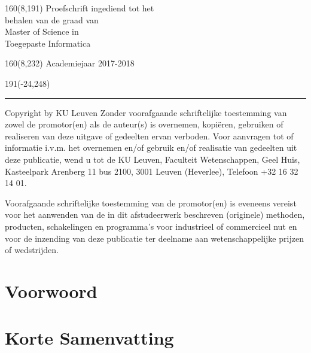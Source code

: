 \documentclass[12pt,a4paper,oneside]{book}
\begin{document}
%
\begin{textblock}{160}(8,191)
\textblockcolour{}
\vspace{-\parskip}
\flushright
Proefschrift ingediend tot het\\[4.5pt]
behalen van de graad van\\[4.5pt]
Master of Science in\\[4.5pt]
Toegepaste Informatica\\
\end{textblock}
%
\begin{textblock}{160}(8,232)
\textblockcolour{}
\vspace{-\parskip}
\flushright
Academiejaar 2017-2018
\end{textblock}
%
\begin{textblock}{191}(-24,248)
{\color{blueline}\rule{550pt}{5.5pt}}
\end{textblock}
%
\vfill
\newpage

\textsf{\textcopyright} Copyright by KU Leuven
Zonder voorafgaande schriftelijke toestemming van zowel de promotor(en) als de auteur(s) is overnemen, kopiëren, gebruiken of realiseren van deze uitgave of gedeelten ervan verboden. Voor aanvragen tot of informatie i.v.m. het overnemen en/of gebruik en/of realisatie van gedeelten uit deze publicatie, wend u tot de KU Leuven, Faculteit Wetenschappen, Geel Huis, Kasteelpark Arenberg 11 bus 2100, 3001 Leuven (Heverlee), Telefoon +32 16 32 14 01.

Voorafgaande schriftelijke toestemming van de promotor(en) is eveneens vereist voor het aanwenden van de in dit afstudeerwerk beschreven (originele) methoden, producten, schakelingen en programma’s voor industrieel of commercieel nut en voor de inzending van deze publicatie ter deelname aan wetenschappelijke prijzen of wedstrijden.

\vfill
\newpage

\rmfamily
\setcounter{page}{0}
\frontmatter
\chapter{Voorwoord}
\chapter{Korte Samenvatting}
\end{document}

